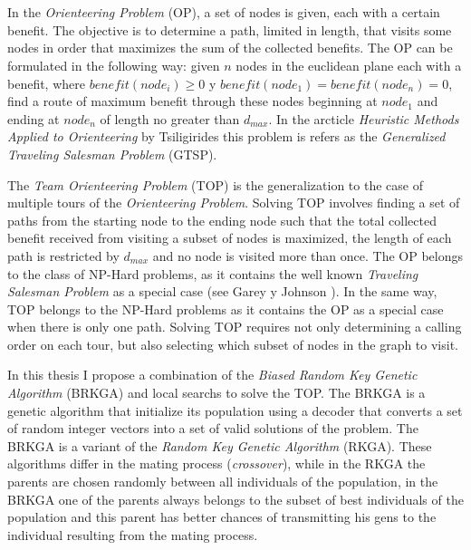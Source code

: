 
\chapter*{\tituloAbstractEn}

\noindent In the \textit{Orienteering Problem} (OP), a set of nodes is given, each with a certain benefit. The objective is to determine a path, limited in length, that visits some nodes in order that maximizes the sum of the collected benefits. The OP can be formulated in the following way: given $n$ nodes in the euclidean plane each with a benefit, where $benefit(node_i) \geq 0$ y $benefit(node_1) = benefit(node_n) = 0$, find a route of maximum benefit through these nodes beginning at $node_1$ and ending at $node_n$ of length no greater than $d_{max}$. In the  arcticle \textit{Heuristic Methods Applied to Orienteering} by Tsiligirides \cite{Tsiligirides} this problem is refers as the \textit{Generalized Traveling Salesman Problem} (GTSP).

\bigskip

The \textit{Team Orienteering Problem} (TOP) is the generalization to the case of multiple tours of the \textit{Orienteering Problem}. Solving TOP involves finding a set of paths from the starting node to the ending node such that the total collected benefit received from visiting a subset of nodes is maximized, the length of each path is restricted by $d_{max}$ and no node is visited more than once. The OP belongs to the class of NP-Hard problems, as it contains the well known \textit{Traveling Salesman Problem} as a special case (see Garey y Johnson \cite{GareyJohnson}). In the same way, TOP belongs to the NP-Hard problems as it contains the OP as a special case when there is only one path. Solving TOP requires not only determining a calling order on each tour, but also selecting which subset of nodes in the graph to visit.

\bigskip

In this thesis I propose a combination of the \textit{Biased Random Key Genetic Algorithm} (BRKGA) and local searchs to solve the TOP. The BRKGA is a genetic algorithm that initialize its population using a decoder that converts a set of random integer vectors into a set of valid solutions of the problem. The BRKGA is a variant of the \textit{Random Key Genetic Algorithm} (RKGA). These algorithms differ in the mating process (\textit{crossover}), while in the RKGA the parents are chosen randomly between all individuals of the population, in the BRKGA one of the parents always belongs to the subset of best individuals of the population and this parent has better chances of transmitting his gens to the individual resulting from the mating process.

